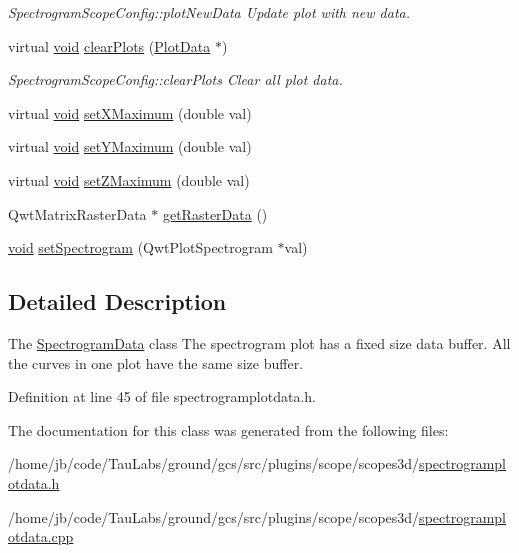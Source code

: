 \begin{DoxyCompactItemize}
\begin{DoxyCompactList}\small\item\em \-Spectrogram\-Scope\-Config\-::plot\-New\-Data \-Update plot with new data. \end{DoxyCompactList}\item 
virtual \hyperlink{group___u_a_v_objects_plugin_ga444cf2ff3f0ecbe028adce838d373f5c}{void} \hyperlink{group___scope_plugin_ga3976392eaccf049644001f3e6c7596ad}{clear\-Plots} (\hyperlink{class_plot_data}{\-Plot\-Data} $\ast$)
\begin{DoxyCompactList}\small\item\em \-Spectrogram\-Scope\-Config\-::clear\-Plots \-Clear all plot data. \end{DoxyCompactList}\item 
virtual \hyperlink{group___u_a_v_objects_plugin_ga444cf2ff3f0ecbe028adce838d373f5c}{void} \hyperlink{group___scope_plugin_ga47ae0c37eea393bc7c83907b6fceb173}{set\-X\-Maximum} (double val)
\item 
virtual \hyperlink{group___u_a_v_objects_plugin_ga444cf2ff3f0ecbe028adce838d373f5c}{void} \hyperlink{group___scope_plugin_ga1379bb89fb91d5f6c894fbf000c65cae}{set\-Y\-Maximum} (double val)
\item 
virtual \hyperlink{group___u_a_v_objects_plugin_ga444cf2ff3f0ecbe028adce838d373f5c}{void} \hyperlink{group___scope_plugin_ga90a7b5815000fba373fc23d13506ce5f}{set\-Z\-Maximum} (double val)
\item 
\-Qwt\-Matrix\-Raster\-Data $\ast$ \hyperlink{group___scope_plugin_ga6373cb623e2b93290e6251c913a3330f}{get\-Raster\-Data} ()
\item 
\hyperlink{group___u_a_v_objects_plugin_ga444cf2ff3f0ecbe028adce838d373f5c}{void} \hyperlink{group___scope_plugin_ga357b6fb785d9356c39fe80f5f1a7d88f}{set\-Spectrogram} (\-Qwt\-Plot\-Spectrogram $\ast$val)
\end{DoxyCompactItemize}


\subsection{\-Detailed \-Description}
\-The \hyperlink{class_spectrogram_data}{\-Spectrogram\-Data} class \-The spectrogram plot has a fixed size data buffer. \-All the curves in one plot have the same size buffer. 

\-Definition at line 45 of file spectrogramplotdata.\-h.



\-The documentation for this class was generated from the following files\-:\begin{DoxyCompactItemize}
\item 
/home/jb/code/\-Tau\-Labs/ground/gcs/src/plugins/scope/scopes3d/\hyperlink{spectrogramplotdata_8h}{spectrogramplotdata.\-h}\item 
/home/jb/code/\-Tau\-Labs/ground/gcs/src/plugins/scope/scopes3d/\hyperlink{spectrogramplotdata_8cpp}{spectrogramplotdata.\-cpp}\end{DoxyCompactItemize}

